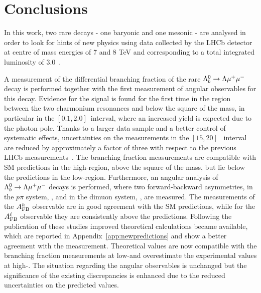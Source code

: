 \chapter{Conclusions}
\label{sec:conclusions}

In this work, two rare decays - one baryonic and one mesonic - are analysed in order to look for hints of new physics using data collected by the LHCb 
detector at centre of mass energies of 7 and 8 TeV and corresponding to a total integrated luminosity of 3.0~\invfb.

A measurement of the differential branching fraction of the rare $\Lambda^0_b\rightarrow\Lambda\mu^+\mu^-$ decay is performed together
with the first measurement of angular observables for this decay.
Evidence for the signal is found for the first time in the \qsq region between the two charmonium resonances and 
below the square of the \jpsi mass, in particular in the $[0.1,2.0]$~\gevgevcccc interval, 
where an increased yield is expected due to the photon pole. 
Thanks to a larger data sample and a better control of systematic effects, uncertainties on the measurements in the $[15,20]$~\gevgevcccc
interval are reduced by approximately a factor of three with respect to the previous LHCb measurements~\cite{LHCb-PAPER-2013-025}. 
The branching fraction measurements are compatible with SM predictions in the high-\qsq region, above the square
 of the \jpsi mass, but lie below the predictions in the low-\qsq region. Furthermore, an angular analysis of $\Lambda^0_b\rightarrow\Lambda\mu^+\mu^-$ decays
 is performed, where two forward-backward asymmetries, in the $p\pi$ system, \afbh, and in the dimuon system, \afbl, are measured. 
 The measurements of the $A_{\rm FB}^h$ observable are in good agreement with the SM predictions, while for the $A_{\rm FB}^\ell$ observable
 they are consistently above the predictions. Following the publication of these studies improved theoretical calculations 
 became available, which are reported in Appendix~\ref{app:newpredictions} and show a better agreement with the measurement. 
 Theoretical values are now compatible with the branching fraction measurements at low-\qsq and overestimate the experimental 
 values at high-\qsq. The situation regarding the angular observables is unchanged but the 
 significance of the existing discrepancies is enhanced due to the reduced uncertainties on the predicted values.
 
